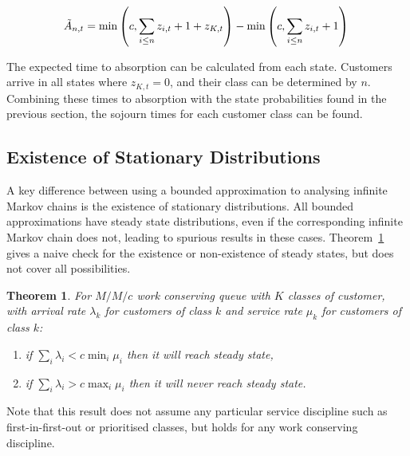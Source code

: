 \documentclass{article}
\newtheorem{theorem}{Theorem}
\begin{document}
\begin{equation}\label{eqn:inservice_adapt_tilde}
\tilde{A}_{n,t} =
\min\left(c, \sum_{i \leq n} z_{i,t} + 1 + z_{K,t}\right) - \min\left(c, \sum_{i \leq n} z_{i,t} + 1\right) \\
\end{equation}


The expected time to absorption can be calculated from each state.
Customers arrive in all states where $z_{K,t} = 0$, and their class can be
determined by $n$. Combining these times to absorption with the state
probabilities found in the previous section, the sojourn times for each customer
class can be found.


\subsection{Existence of Stationary Distributions}\label{sec:stationary}
A key difference between using a bounded approximation to analysing infinite
Markov chains is the existence of stationary distributions. All bounded
approximations have steady state distributions, even if the corresponding
infinite Markov chain does not, leading to spurious results in these cases.
Theorem~\ref{thrm:steadystate} gives a naive check for the existence or
non-existence of steady states, but does not cover all possibilities.

\begin{theorem}\label{thrm:steadystate}
For $M/M/c$ work conserving queue with $K$ classes of customer, with arrival
rate $\lambda_k$ for customers of class $k$ and service rate $\mu_k$ for
customers of class $k$:
\begin{enumerate}
  \item if $\sum_i \lambda_i < c \min_i \mu_i$ then it will reach steady state,
  \item if $\sum_i \lambda_i > c \max_i \mu_i$ then it will never reach steady state.
\end{enumerate}
\end{theorem}

Note that this result does not assume any particular service discipline such as
first-in-first-out or prioritised classes, but holds for any work conserving
discipline.
\end{document}
